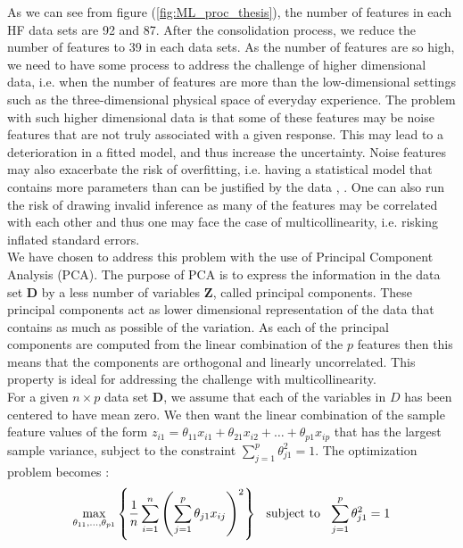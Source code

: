 \documentclass[../thesis.tex]{subfiles}
\begin{document}
\noindent As we can see from figure (\ref{fig:ML_proc_thesis}), the number of features in each HF data sets are 92 and 87. After the consolidation process, we reduce the number of features to 39 in each data sets. As the number of features are so high, we need to have some process to address the challenge of higher dimensional data, i.e. when the number of features are more than the low-dimensional settings such as the three-dimensional physical space of everyday experience. The problem with such higher dimensional data is that some of these features may be noise features that are not truly associated with a given response. This may lead to a deterioration in a fitted model, and thus increase the uncertainty. Noise features may also exacerbate the risk of overfitting, i.e. having a statistical model that contains more parameters than can be justified by the data \citep{friedman2009elements}, \citep{james2013introduction}. One can also run the risk of drawing invalid inference as many of the features may be correlated with each other and thus one may face the case of multicollinearity, i.e. risking inflated standard errors.\\
\indent We have chosen to address this problem with the use of Principal Component Analysis (PCA). The purpose of PCA is to express the information in the data set $\mathbf{D}$ by a less number of variables $\mathbf{Z}$, called principal components. These principal components act as lower dimensional representation of the data that contains as much as possible of the variation. As each of the principal components are computed from the linear combination of the $p$ features then this means that the components are orthogonal and linearly uncorrelated. This property is ideal for addressing the challenge with multicollinearity.\\
\indent For a given $n \times p$ data set $\mathbf{D}$, we assume that each of the variables in $D$ has been centered to have mean zero. We then want the linear combination of the sample feature values of the form $z_{i1} = \theta_{11}x_{i1} + \theta_{21}x_{i2} + \hdots + \theta_{p1}x_{ip}$ that has the largest sample variance, subject to the constraint $\sum_{j = 1}^p \theta_{j1}^2 = 1$. The optimization problem becomes \citep{james2013introduction}:
\begin{align}
    \max_{\theta_{11}, \hdots, \theta_{p1}} \left\{\frac{1}{n} \sum_{i=1}^n \left(\sum_{j=1}^p \theta_{j1}x_{ij} \right)^2 \right\} \hspace{0,25cm} \text{subject to} \hspace{0,25cm} \sum_{j=1}^p\theta^2_{j1} = 1
\end{align}
\end{document}
